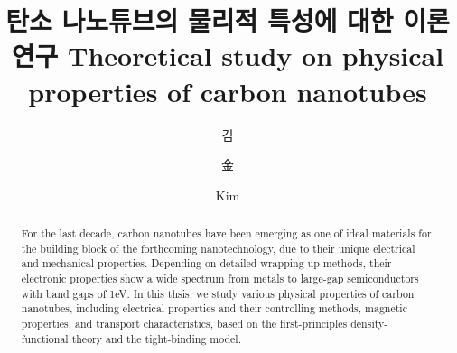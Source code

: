 \documentclass[doctor,english,final]{kaist-ucs}
\title[korean] {탄소 나노튜브의 물리적 특성에 대한 이론 연구}
\title[english]{ Theoretical study on physical properties of
                carbon nanotubes}
\author[korean] {김}{용 현}
\author[chinese]{金}{容 賢}
\author[english]{Kim}{Yong-Hyun}
\begin{document}

    \begin{abstract}
        For the last decade, carbon nanotubes have been emerging as one
        of ideal materials for the building block of the forthcoming
        nanotechnology, due to their unique electrical and mechanical
        properties. Depending on detailed wrapping-up methods, their
        electronic properties show a wide spectrum from metals to
        large-gap semiconductors with band gaps of 1eV.
        In this thsis, we study various physical properties of carbon
        nanotubes, including electrical properties and their controlling
        methods, magnetic properties, and transport characteristics,
        based on the first-principles density-functional theory and
        the tight-binding model.
    \end{abstract}

    \tableofcontents

    \listoftables

    \listoffigures



%

\end{document}
